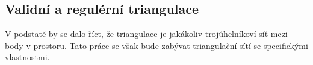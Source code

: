 \documentclass[12pt,a4paper]{article}
\begin{document}
\newpage
\begin{figure}[h!]
\centering
\begin{floatrow}
\end{floatrow}
\end{figure}

\newpage
\subsection{Validní a regulérní triangulace}
V podstatě by se dalo říct, že triangulace je jakákoliv trojúhelníkoví síť mezi body v prostoru. Tato práce se však bude zabývat triangulační sítí se specifickými vlastnostmi.
\end{document}
